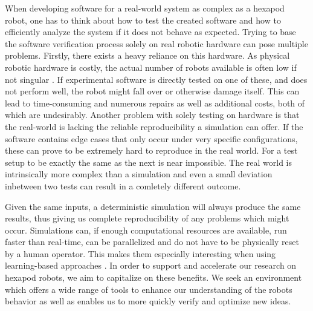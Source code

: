 When developing software for a real-world system as complex as a hexapod robot, one has to think about how to test the created software and how to efficiently analyze the system if it does not behave as expected.
Trying to base the software verification process solely on real robotic hardware can pose multiple problems.
Firstly, there exists a heavy reliance on this hardware.
As physical robotic hardware is costly, the actual number of robots available is often low if not singular \parencite{collins2021review, marvel2014collaborative}.
If experimental software is directly tested on one of these, and does not perform well, the robot might fall over or otherwise damage itself.
This can lead to time-consuming  and numerous repairs as well as additional costs, both of which are undesirably.
Another problem with solely testing on hardware is that the real-world is lacking the reliable reproducibility a simulation can offer.
If the software contains edge cases that only occur under very specific configurations, these can prove to be extremely hard to reproduce in the real world.
For a test setup to be exactly the same as the next is near impossible.
The real world is intrinsically more complex than a simulation and even a small deviation inbetween two tests can result in a comletely different outcome.

Given the same inputs, a deterministic simulation will always produce the same results, thus giving us complete reproducibility of any problems which might occur.
Simulations can, if enough computational resources are available, run faster than real-time, can be parallelized and do not have to be physically reset by a human operator.
This makes them especially interesting when using learning-based approaches \parencite{collins2021review}.
In order to support and accelerate our research on hexapod robots, we aim to capitalize on these benefits.
We seek an environment which offers a wide range of tools to enhance our understanding of the robots behavior as well as enables us to more quickly verify and optimize new ideas.

